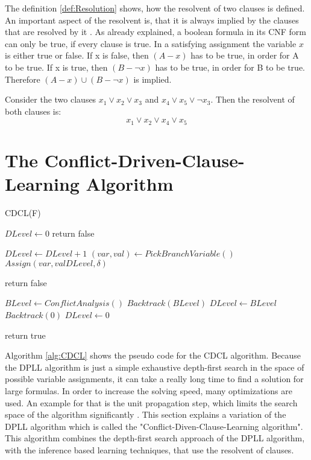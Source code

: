 The definition \ref{def:Resolution} shows, how the resolvent of two clauses is defined. An important aspect of the resolvent is, that it is always implied by the clauses that are resolved by it \cite{biere2009handbook}. As already explained, a boolean formula in its CNF form can only be true, if every clause is true. In a satisfying assignment the variable $x$ is either true or false. If x is false, then $(A - x)$ has to be true, in order for A to be true. If x is true, then $(B - \neg x)$ has to be true, in order for B to be true. Therefore $(A - x) \cup (B - \neg x)$ is implied.

\begin{leftbar}
Consider the two clauses $x_1 \vee x_2 \vee x_3$ and $x_4 \vee x_5 \vee \neg x_3$. Then the resolvent of both clauses is:
\begin{displaymath}
x_1 \vee x_2 \vee x_4 \vee x_5
\end{displaymath}
\end{leftbar}

\section{The Conflict-Driven-Clause-Learning Algorithm}
\label{sec:cdcl}

\begin{algorithm}
\caption{CDCL(F) \cite{biere2009handbook}}\label{alg:CDCL}
\begin{algorithmic}
\State $DLevel \gets 0$
	\State return false
\EndIf

	\State $DLevel \gets DLevel + 1$
	\State $(var, val) \gets PickBranchVariable()$
	\State $Assign(var, val DLevel, \delta)$
	
			\State return false
		\EndIf
	
	
		\State $BLevel \gets ConflictAnalysis()$
		\State $Backtrack(BLevel)$
		\State $DLevel \gets BLevel$
			\State $Backtrack(0)$
			\State $DLevel \gets 0$
		\EndIf
	\EndWhile
\EndWhile

\State return true

\end{algorithmic}
\end{algorithm}

Algorithm \ref{alg:CDCL} \cite{biere2009handbook} shows the pseudo code for the CDCL algorithm. Because the DPLL algorithm is just a simple exhaustive depth-first search in the space of possible variable assignments, it can take a really long time to find a solution for large formulas. In order to increase the solving speed, many optimizations are used. An example for that is the unit propagation step, which limits the search space of the algorithm significantly \cite{biere2009handbook}. This section explains a variation of the DPLL algorithm which is called the "Conflict-Diven-Clause-Learning algorithm". This algorithm combines the depth-first search approach of the DPLL algorithm, with the inference based learning techniques, that use the resolvent of clauses. \cite{biere2009handbook}

